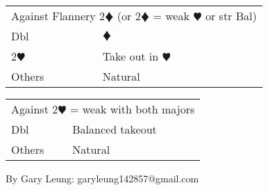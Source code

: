 \documentclass{article}
\newcommand{\he}{\textcolor{RubineRed}{$\varheart$}}
\newcommand{\di}{\textcolor{Peach}{$\vardiamond$}}
\begin{document}
\medskip

\begin{tabular}{|l|p{6.5cm}}
	\multicolumn{2}{l}{Against Flannery 2\di{} (or 2\di{} = weak \he{} or str Bal)} \\
    Dbl & \di{} \\
    2\he{}& Take out in \he{}\\
    Others & Natural
\end{tabular}

\medskip

\begin{tabular}{|l|p{6.5cm}}
	\multicolumn{2}{l}{Against 2\he{} = weak with both majors} \\
    Dbl & Balanced takeout \\
    Others & Natural
\end{tabular}

\vfill
\hfill \footnotesize{By Gary Leung: garyleung142857@gmail.com}
\end{document}
